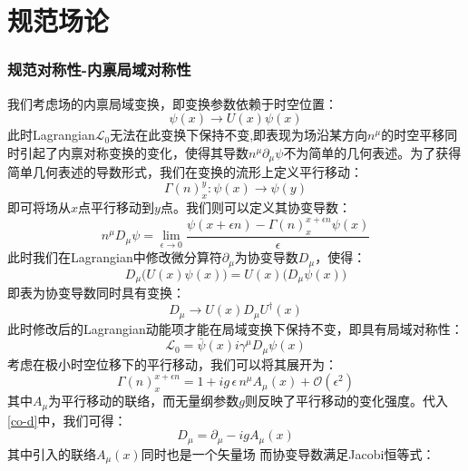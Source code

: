 \epigraphhead[650]{}
\part{规范场论}
\section*{规范对称性-内禀局域对称性}
我们考虑场的内禀局域变换，即变换参数依赖于时空位置：
\begin{equation}
	\psi(x)\rightarrow U(x)\psi(x) \tag{P.2.1}
\end{equation}
此时Lagrangian$\mathscr{L}_0$无法在此变换下保持不变,即表现为场沿某方向$n^\mu$的时空平移同时引起了内禀对称变换的变化，使得其导数$n^\mu\partial_\mu\psi$不为简单的几何表述。为了获得简单几何表述的导数形式，我们在变换的流形上定义平行移动：
\begin{equation}
	\Gamma(n)^y_x : \psi(x)\rightarrow\psi(y) \tag{P.2.2}
\end{equation}
即可将场从$x$点平行移动到$y$点。我们则可以定义其协变导数：
\begin{equation}
	n^\mu D_\mu\psi=\lim_{\epsilon\rightarrow 0}\frac{\psi(x+\epsilon n)-\Gamma(n)^{x+\epsilon n}_x\psi(x)}{\epsilon}\tag{P.2.3}
	\label{co-d}
\end{equation}
此时我们在Lagrangian中修改微分算符$\partial_\mu$为协变导数$D_\mu$，使得：
\begin{equation}
	D_\mu\Big( U(x)\psi(x)\Big)=U(x)\Big(D_\mu \psi(x)\Big)\tag{P.2.4}
\end{equation}
即表为协变导数同时具有变换：
\begin{equation}
	D_\mu\rightarrow U(x)D_\mu U^\dagger(x)\tag{P.2.5}
\end{equation}
此时修改后的Lagrangian动能项才能在局域变换下保持不变，即具有局域对称性：
\begin{equation}
	\mathscr{L}_0=\bar{\psi}(x)i\gamma^\mu D_\mu\psi(x)\tag{P.2.6}
\end{equation}
考虑在极小时空位移下的平行移动，我们可以将其展开为：
\begin{equation}
	\Gamma(n)^{x+\epsilon n}_x = 1 + i g\,\epsilon\, n^\mu A_\mu(x) +\mathcal{O}(\epsilon^2)\tag{P.2.7}
\end{equation}
其中$A_\mu$为平行移动的联络，而无量纲参数$g$则反映了平行移动的变化强度。代入\eqref{co-d}中，我们可得：
\begin{equation}
	D_\mu=\partial_\mu-ig A_\mu(x)\tag{P.2.8}
\end{equation}
其中引入的联络$A_\mu(x)$同时也是一个矢量场
而协变导数满足Jacobi恒等式：
